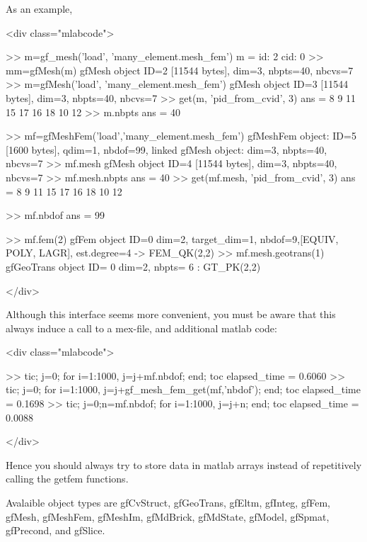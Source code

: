 \documentclass[11pt,a4paper]{article}
\newcommand{\hypertarget}[1]{\label{#1}}
\newcommand{\sf}[1]{#1}
\newenvironment{matlab}{\begin{rawxml}<div class="mlabcode">\end{rawxml}\begin{example}}{\end{example}\begin{rawxml}</div>\end{rawxml}}
\newenvironment{matlab}{\begin{alltt}}{\end{alltt}}
\newcommand{\mlab}{{\sf matlab}\xspace}
\begin{document}
As an example, 
\begin{matlab}
>> m=gf_mesh('load', 'many_element.mesh_fem')
m =
     id: 2
    cid: 0
>> mm=gfMesh(m)
gfMesh object ID=2 [11544 bytes], dim=3, nbpts=40, nbcvs=7
>> m=gfMesh('load', 'many_element.mesh_fem')
gfMesh object ID=3 [11544 bytes], dim=3, nbpts=40, nbcvs=7
>> get(m, 'pid_from_cvid', 3)
ans =
     8     9    11    15    17    16    18    10    12
>> m.nbpts
ans =
    40

>> mf=gfMeshFem('load','many_element.mesh_fem')
gfMeshFem object: ID=5 [1600 bytes], qdim=1, nbdof=99,
  linked gfMesh object: dim=3, nbpts=40, nbcvs=7
>> mf.mesh
gfMesh object ID=4 [11544 bytes], dim=3, nbpts=40, nbcvs=7
>> mf.mesh.nbpts
ans =
    40
>> get(mf.mesh, 'pid_from_cvid', 3)
ans =
     8     9    11    15    17    16    18    10    12
   
>> mf.nbdof
ans =
    99

>> mf.fem(2)  
gfFem object ID=0 dim=2, target_dim=1, nbdof=9,[EQUIV, POLY, LAGR], est.degree=4
 -> FEM_QK(2,2)
>> mf.mesh.geotrans(1)
gfGeoTrans object ID= 0 dim=2, nbpts= 6 : GT_PK(2,2)
\end{matlab}

Although this interface seems more convenient, you must be aware that this
always induce a call to a mex-file, and additional \mlab code:
\begin{matlab}
>> tic; j=0; for i=1:1000, j=j+mf.nbdof; end; toc
elapsed_time =
    0.6060
>> tic; j=0; for i=1:1000, j=j+gf_mesh_fem_get(mf,'nbdof'); end; toc
elapsed_time =
    0.1698
>> tic; j=0;n=mf.nbdof;  for i=1:1000, j=j+n; end; toc                           
elapsed_time =
    0.0088
\end{matlab}

Hence you should always try to store data in \mlab arrays instead of repetitively
calling the getfem functions.


Avalaible object types are \hypertarget{gfCvStruct}gfCvStruct, 
\hypertarget{gfGeoTrans}gfGeoTrans, 
\hypertarget{gfEltm}gfEltm, 
\hypertarget{gfInteg}gfInteg, 
\hypertarget{gfFem}gfFem, 
\hypertarget{gfMesh}gfMesh, 
\hypertarget{gfMeshFem}gfMeshFem, 
\hypertarget{gfMeshIm}gfMeshIm, 
\hypertarget{gfMdBrick}gfMdBrick, 
\hypertarget{gfMdState}gfMdState, 
\hypertarget{gfModel}gfModel, 
\hypertarget{gfSpmat}gfSpmat, 
\hypertarget{gfPrecond}gfPrecond, 
\hypertarget{gfSlice}and gfSlice.
\end{document}
